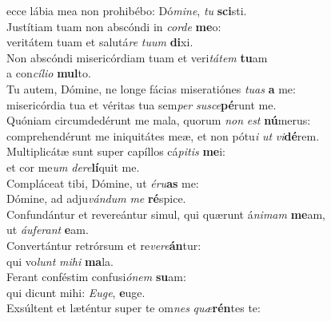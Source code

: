 \evenverse ecce lábia mea non prohibébo: Dó\textit{mi}\textit{ne}, \textit{tu} \textbf{sci}sti.\\
\oddverse Justítiam tuam non abscóndi in \textit{cor}\textit{de} \textbf{me}o:~\*\\
\oddverse veritátem tuam et salutá\textit{re} \textit{tu}\textit{um} \textbf{di}xi.\\
\evenverse Non abscóndi misericórdiam tuam et veri\textit{tá}\textit{tem} \textbf{tu}am~\*\\
\evenverse a con\textit{cí}\textit{li}\textit{o} \textbf{mul}to.\\
\oddverse Tu autem, Dómine, ne longe fácias miseratiónes \textit{tu}\textit{as} \textbf{a} me:~\*\\
\oddverse misericórdia tua et véritas tua sem\textit{per} \textit{su}\textit{sce}\textbf{pé}runt me.\\
\evenverse Quóniam circumdedérunt me mala, quorum \textit{non} \textit{est} \textbf{nú}merus:~\*\\
\evenverse comprehendérunt me iniquitátes meæ, et non pótu\textit{i} \textit{ut} \textit{vi}\textbf{dé}rem.\\
\oddverse Multiplicátæ sunt super capíllos cá\textit{pi}\textit{tis} \textbf{me}i:~\*\\
\oddverse et cor me\textit{um} \textit{de}\textit{re}\textbf{lí}quit me.\\
\evenverse Compláceat tibi, Dómine, ut \textit{é}\textit{ru}\textbf{as} me:~\*\\
\evenverse Dómine, ad adju\textit{ván}\textit{dum} \textit{me} \textbf{ré}spice.\\
\oddverse Confundántur et revereántur simul, qui quærunt á\textit{ni}\textit{mam} \textbf{me}am,~\*\\
\oddverse ut \textit{áu}\textit{fe}\textit{rant} \textbf{e}am.\\
\evenverse Convertántur retrórsum et re\textit{ve}\textit{re}\textbf{án}tur:~\*\\
\evenverse qui vo\textit{lunt} \textit{mi}\textit{hi} \textbf{ma}la.\\
\oddverse Ferant conféstim confusi\textit{ó}\textit{nem} \textbf{su}am:~\*\\
\oddverse qui dicunt mihi: \textit{E}\textit{u}\textit{ge}, \textbf{e}uge.\\
\evenverse Exsúltent et læténtur super te om\textit{nes} \textit{quæ}\textbf{rén}tes te:~\*\\
